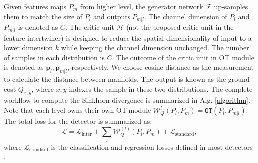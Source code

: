 \documentclass{article} \usepackage{iclr2019_conference,times}
\begin{document}
Given features maps $P_m$ from higher level, the generator network $\mathcal{F}$ up-samples {them} to match the size of $P_l$ and outputs $P_{m|l}$. The channel dimension of $P_l$ and $P_{m|l}$ is denoted as $C$.
The critic unit $\mathcal{H}$ (not the proposed critic unit in the feature intertwiner) is designed to reduce the spatial dimensionality of input to  a lower dimension $k$ while keeping the channel dimension unchanged. The number of samples in each distribution is $C$. 
The outcome of the critic unit in OT module is denoted as $\bm{p}_l, \bm{p}_{m|l}$, respectively.
We choose cosine distance as the measurement to calculate the distance between manifolds. 
The output is known as the ground cost $Q_{x,y}$, where $x,y$ indexes the sample in these two distributions. The complete workflow to compute the Sinkhorn divergence is summarized in Alg. \ref{algorithm}. 
Note that each level owns their own OT module 
$\mathcal{W}_{Q}^{l}(P_l, P_m)=\texttt{OT}(P_{l}, P_{m|l})$. 
The total loss for the detector is summarized as:
\begin{equation}
    \mathcal{L} = \mathcal{L}_{\text{inter}} + \sum_l\mathcal{W}_{Q}^{(l)}(P_l, P_m) +  \mathcal{L}_{\text{standard}},
\end{equation}
where $\mathcal{L}_{\text{standard}}$ is the classification and regression losses defined in most detectors 
\citep{ross15_fast_rcnn}.  
\end{document}
